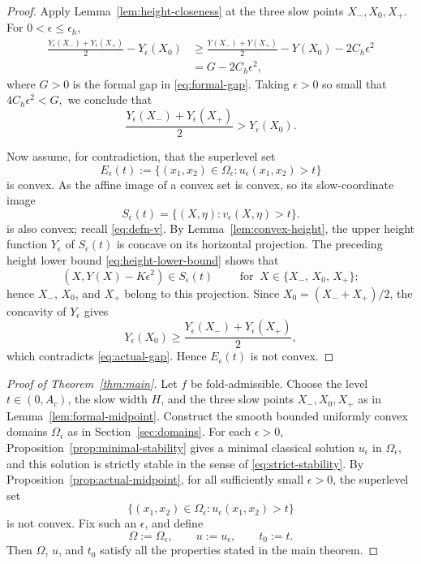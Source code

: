 \documentclass[reqno,12pt]{amsart}
\numberwithin{equation}{section}
\theoremstyle{remark}
\begin{document}
\begin{proof}
Apply Lemma~\ref{lem:height-closeness} at the three slow points
$X_-,X_0,X_+$.  For $0<\epsilon\le\epsilon_h$,
$$
\begin{aligned}
\frac{Y_\epsilon(X_-)+Y_\epsilon(X_+)}2-Y_\epsilon(X_0)
&\ge
\frac{Y(X_-)+Y(X_+)}2-Y(X_0)-2C_h\epsilon^2\\
&=G-2C_h\epsilon^2,
\end{aligned}
$$
where $G>0$ is the formal gap in \eqref{eq:formal-gap}.  Taking
$\epsilon>0$ so small that
$4C_h\epsilon^2<G,$
we conclude that
\begin{equation}\label{eq:actual-gap}
\frac{Y_\epsilon(X_-)+Y_\epsilon(X_+)}2>Y_\epsilon(X_0).
\end{equation}

Now assume, for contradiction, that the superlevel set
$$
E_\epsilon(t):=
\{(x_1,x_2)\in\Omega_\epsilon:u_\epsilon(x_1,x_2)>t\}
$$
is convex.  As the affine image of a convex set is convex, so its slow-coordinate image
$$
S_\epsilon(t)=\{(X,\eta):v_\epsilon(X,\eta)>t\}.
$$
is also convex; recall \eqref{eq:defn-v}.  By Lemma~\ref{lem:convex-height}, the upper height function $Y_\epsilon$ of $S_\epsilon(t)$ is concave on its horizontal projection.  The preceding height lower bound \eqref{eq:height-lower-bound} shows that 
$$ (X, Y(X)-K\epsilon^2) \in S_\epsilon(t)\qquad \text{ for } \ X\in \{X_-,\, X_0,\,X_+\};$$
hence
$X_-$, $X_0$, and $X_+$ belong to this
projection.  Since $X_0=(X_-+X_+)/2$, the concavity of $Y_\epsilon$  gives
$$
Y_\epsilon(X_0)
\ge
\frac{Y_\epsilon(X_-)+Y_\epsilon(X_+)}2,
$$
which contradicts \eqref{eq:actual-gap}.  Hence $E_\epsilon(t)$ is not convex.
\end{proof}

\begin{proof}[Proof of Theorem~\ref{thm:main}]
Let $f$ be fold-admissible.  Choose the level $t\in(0,A_c)$, the slow width
$H$, and the three slow points $X_-,X_0,X_+$ as in
Lemma~\ref{lem:formal-midpoint}.  Construct the smooth bounded uniformly convex
domains $\Omega_\epsilon$ as in Section~\ref{sec:domains}.  For each
$\epsilon>0$, Proposition~\ref{prop:minimal-stability} gives a minimal
classical solution $u_\epsilon$ in $\Omega_\epsilon$, and this solution is
strictly stable in the sense of \eqref{eq:strict-stability}.  By
Proposition~\ref{prop:actual-midpoint}, for all sufficiently small
$\epsilon>0$, the superlevel set
$$
\{(x_1,x_2)\in\Omega_\epsilon:u_\epsilon(x_1,x_2)>t\}
$$
is not convex.  Fix such an $\epsilon$, and define
$$
\Omega := \Omega_\epsilon,\qquad u := u_\epsilon,\qquad t_0 := t.
$$
Then $\Omega$, $u$, and $t_0$ satisfy all the properties stated in the main theorem.
\end{proof}
\end{document}
